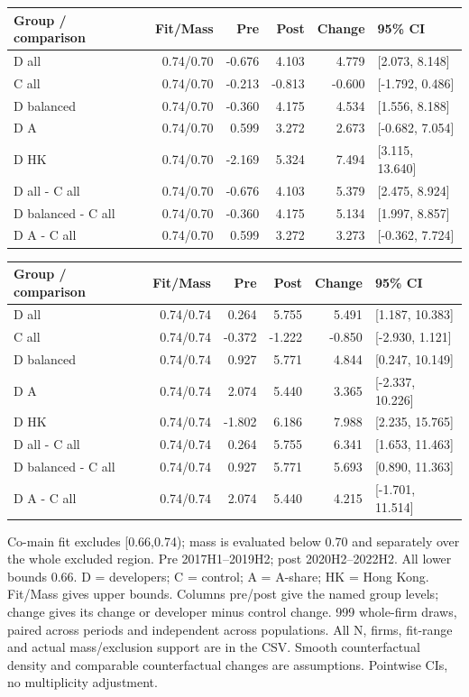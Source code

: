 \begingroup\small
\setlength{\tabcolsep}{3.5pt}
\begin{tabular}{lrrrrl}
\toprule
Group / comparison & Fit/Mass & Pre & Post & Change & 95\% CI \\
\midrule
D all & 0.74/0.70 & -0.676 & 4.103 & 4.779 & [2.073, 8.148] \\
C all & 0.74/0.70 & -0.213 & -0.813 & -0.600 & [-1.792, 0.486] \\
D balanced & 0.74/0.70 & -0.360 & 4.175 & 4.534 & [1.556, 8.188] \\
D A & 0.74/0.70 & 0.599 & 3.272 & 2.673 & [-0.682, 7.054] \\
D HK & 0.74/0.70 & -2.169 & 5.324 & 7.494 & [3.115, 13.640] \\
D all - C all & 0.74/0.70 & -0.676 & 4.103 & 5.379 & [2.475, 8.924] \\
D balanced - C all & 0.74/0.70 & -0.360 & 4.175 & 5.134 & [1.997, 8.857] \\
D A - C all & 0.74/0.70 & 0.599 & 3.272 & 3.273 & [-0.362, 7.724] \\
\bottomrule
\end{tabular}
\par\medskip
\begin{tabular}{lrrrrl}
\toprule
Group / comparison & Fit/Mass & Pre & Post & Change & 95\% CI \\
\midrule
D all & 0.74/0.74 & 0.264 & 5.755 & 5.491 & [1.187, 10.383] \\
C all & 0.74/0.74 & -0.372 & -1.222 & -0.850 & [-2.930, 1.121] \\
D balanced & 0.74/0.74 & 0.927 & 5.771 & 4.844 & [0.247, 10.149] \\
D A & 0.74/0.74 & 2.074 & 5.440 & 3.365 & [-2.337, 10.226] \\
D HK & 0.74/0.74 & -1.802 & 6.186 & 7.988 & [2.235, 15.765] \\
D all - C all & 0.74/0.74 & 0.264 & 5.755 & 6.341 & [1.653, 11.463] \\
D balanced - C all & 0.74/0.74 & 0.927 & 5.771 & 5.693 & [0.890, 11.363] \\
D A - C all & 0.74/0.74 & 2.074 & 5.440 & 4.215 & [-1.701, 11.514] \\
\bottomrule
\end{tabular}
\par\medskip
\footnotesize Co-main fit excludes [0.66,0.74); mass is evaluated below 0.70 and separately over the whole excluded region. Pre 2017H1--2019H2; post 2020H2--2022H2. All lower bounds 0.66.  D = developers; C = control; A = A-share; HK = Hong Kong. Fit/Mass gives upper bounds. Columns pre/post give the named group levels; change gives its change or developer minus control change.  999 whole-firm draws, paired across periods and independent across populations. All N, firms, fit-range and actual mass/exclusion support are in the CSV.  Smooth counterfactual density and comparable counterfactual changes are assumptions. Pointwise CIs, no multiplicity adjustment.
\endgroup
